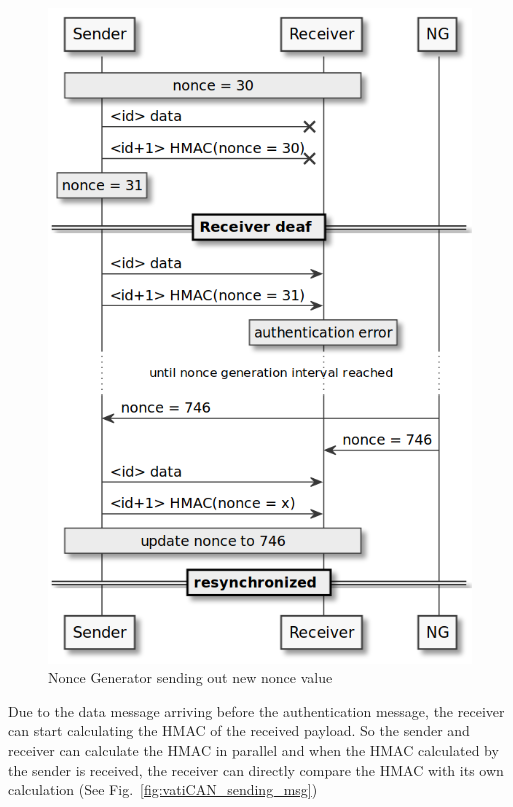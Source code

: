 \begin{figure}[ht]
    \centering
    \captionsetup{justification=centering}
	\includegraphics[width=0.8\linewidth]{Figures/vatiCAN_deaf_time.png}
	\caption[]{Nonce Generator sending out new nonce value}\label{fig:vatiCAN_deaf_time}
\end{figure}

Due to the data message arriving before the authentication message, the receiver
can start calculating the HMAC of the received payload. So the sender and
receiver can calculate the HMAC in parallel and when the HMAC calculated by the
sender is received, the receiver can directly compare the HMAC with its own
calculation (See Fig.~\ref{fig:vatiCAN_sending_msg})

